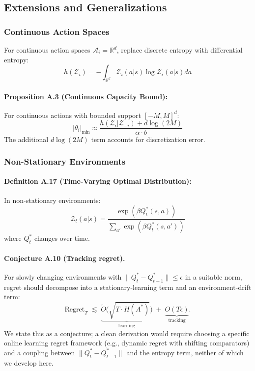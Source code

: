 \documentclass[10pt, letterpaper]{article}
\begin{document}
\subsection{Extensions and Generalizations}

\subsubsection{Continuous Action Spaces}

For continuous action spaces $\mathcal{A}_i = \mathbb{R}^d$, replace discrete entropy with differential entropy:
\[h(\mathcal{Z}_i) = -\int_{\mathbb{R}^d} \mathcal{Z}_i(a|s) \log \mathcal{Z}_i(a|s) da\]

\paragraph{Proposition A.3 (Continuous Capacity Bound):} For continuous actions with bounded support $[-M, M]^d$:
\[|\theta_i|_{\min} \approx \frac{h(\mathcal{Z}_i | \mathcal{Z}_{-i}) + d\log(2M)}{\alpha \cdot b}\]
The additional $d\log(2M)$ term accounts for discretization error.

\subsubsection{Non-Stationary Environments}

\paragraph{Definition A.17 (Time-Varying Optimal Distribution):} In non-stationary environments:
\[\mathcal{Z}_t(a|s) = \frac{\exp(\beta Q^*_t(s,a))}{\sum_{a'} \exp(\beta Q^*_t(s,a'))}\]
where $Q^*_t$ changes over time.

\paragraph{Conjecture A.10 (Tracking regret).} For slowly changing environments with $\|Q^*_t - Q^*_{t-1}\| \leq \epsilon$ in a suitable norm, regret should decompose into a stationary-learning term and an environment-drift term:
\[\text{Regret}_T \;\lesssim\; \underbrace{\widetilde{O}\bigl(\sqrt{T \cdot H(A^*)}\bigr)}_\text{learning} \;+\; \underbrace{O(T\epsilon)}_\text{tracking}.\]
We state this as a conjecture; a clean derivation would require choosing a specific online learning regret framework (e.g., dynamic regret with shifting comparators) and a coupling between $\|Q^*_t - Q^*_{t-1}\|$ and the entropy term, neither of which we develop here.
\end{document}
